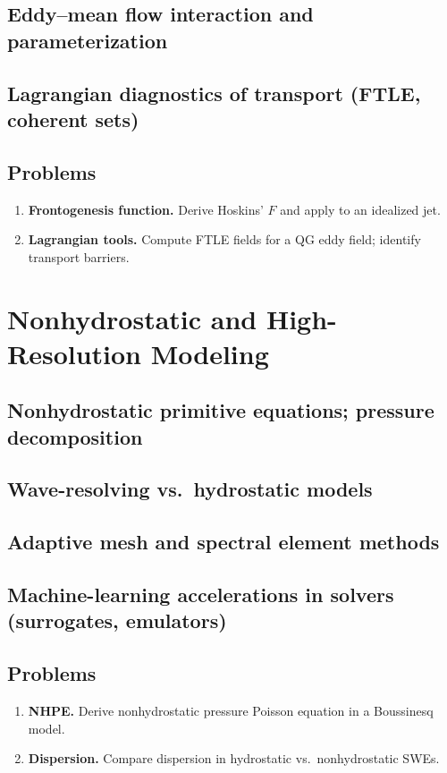 \documentclass[12pt]{book}
\begin{document}
\section{Eddy--mean flow interaction and parameterization}
\section{Lagrangian diagnostics of transport (FTLE, coherent sets)}
\section*{Problems}
\begin{enumerate}
  \item \textbf{Frontogenesis function.} Derive Hoskins’ $F$ and apply to an idealized jet.
  \item \textbf{Lagrangian tools.} Compute FTLE fields for a QG eddy field; identify transport barriers.
\end{enumerate}

\chapter{Nonhydrostatic and High-Resolution Modeling}
\section{Nonhydrostatic primitive equations; pressure decomposition}
\section{Wave-resolving vs.\ hydrostatic models}
\section{Adaptive mesh and spectral element methods}
\section{Machine-learning accelerations in solvers (surrogates, emulators)}
\section*{Problems}
\begin{enumerate}
  \item \textbf{NHPE.} Derive nonhydrostatic pressure Poisson equation in a Boussinesq model.
  \item \textbf{Dispersion.} Compare dispersion in hydrostatic vs.\ nonhydrostatic SWEs.
\end{enumerate}
\end{document}
